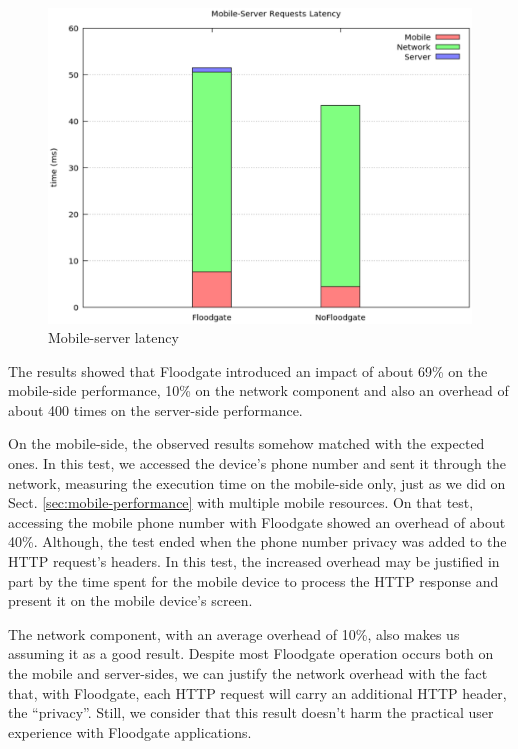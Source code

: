 \begin{figure}[t!]
\includegraphics[width=\textwidth]{figs/mobile-server-latency}
\centering
\caption{Mobile-server latency}
\label{fig:mobile-server-latency}
\end{figure}

The results showed that Floodgate introduced an impact of about 69\% on the mobile-side performance, 10\% on the network component and also an overhead of about 400 times on the server-side performance.

On the mobile-side, the observed results somehow matched with the expected ones. In this test, we accessed the device's phone number and sent it through the network, measuring the execution time on the mobile-side only, just as we did on Sect. \ref{sec:mobile-performance} with multiple mobile resources. On that test, accessing the mobile phone number with Floodgate showed an overhead of about 40\%. Although, the test ended when the phone number privacy was added to the HTTP request's headers. In this test, the increased overhead may be justified in part by the time spent for the mobile device to process the HTTP response and present it on the mobile device's screen.

The network component, with an average overhead of 10\%, also makes us assuming it as a good result. Despite most Floodgate operation occurs both on the mobile and server-sides, we can justify the network overhead with the fact that, with Floodgate, each HTTP request will carry an additional HTTP header, the ``privacy''. Still, we consider that this result doesn't harm the practical user experience with Floodgate applications.

